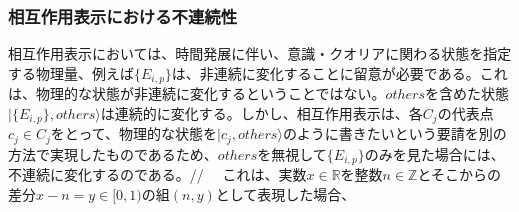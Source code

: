 \subsubsection{相互作用表示における不連続性}
相互作用表示においては、時間発展に伴い、意識・クオリアに関わる状態を指定する物理量、例えば$\{E_{i,p}\}$は、非連続に変化することに留意が必要である。これは、物理的な状態が非連続に変化するということではない。$others$を含めた状態$|\{ E_{i,p}\},others \rangle$は連続的に変化する。しかし、相互作用表示は、各$C_j$の代表点$c_j \in C_j$をとって、物理的な状態を$|c_j,others \rangle$のように書きたいという要請を別の方法で実現したものであるため、$others$を無視して$\{E_{i,p}\}$のみを見た場合には、不連続に変化するのである。//
　これは、実数$x \in \mathbb{R}$を整数$n \in \mathbb{Z}$とそこからの差分$x-n = y \in [0,1)$の組$(n,y)$として表現した場合、
